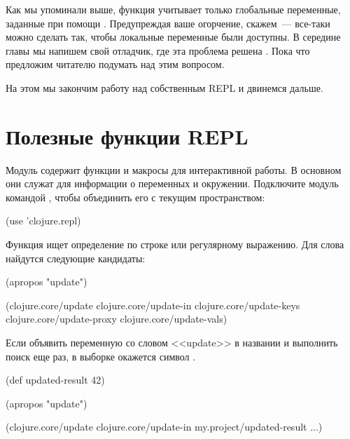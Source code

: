 Как мы упоминали выше, функция  учитывает только глобальные переменные, заданные при помощи . Предупреждая ваше огорчение, скажем~--- все-таки можно сделать так, чтобы локальные переменные были доступны. В середине главы мы напишем свой отладчик, где эта проблема решена . Пока что предложим читателю подумать над этим вопросом.

На этом мы закончим работу над собственным REPL и двинемся дальше.

\section{Полезные функции REPL}


Модуль  содержит функции и макросы для интерактивной работы. В основном они служат для информации о переменных и окружении. Подключите модуль командой , чтобы объединить его с текущим пространством:

\begin{english}
  \begin{clojure}
(use 'clojure.repl)
  \end{clojure}
\end{english}

Функция  ищет определение по строке или регулярному выражению. Для слова  найдутся следующие кандидаты:

\begin{english}
  \begin{clojure}
(apropos "update")

(clojure.core/update
 clojure.core/update-in
 clojure.core/update-keys
 clojure.core/update-proxy
 clojure.core/update-vals)
  \end{clojure}
\end{english}

Если объявить переменную со словом <<update>> в названии и выполнить поиск еще раз, в выборке окажется символ .

\begin{english}
  \begin{clojure}
(def updated-result 42)

(apropos "update")

(clojure.core/update
 clojure.core/update-in
 my.project/updated-result
 ...)
  \end{clojure}
\end{english}


